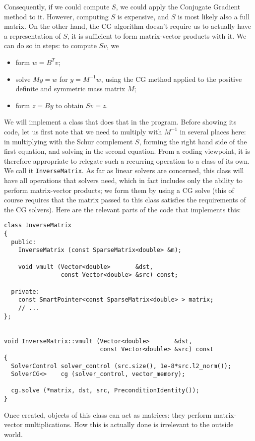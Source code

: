 \documentclass{article}
\begin{document}
Consequently, if we could compute $S$, we could apply the Conjugate Gradient
method to it. However, computing $S$ is expensive, and $S$ is most
likely also a full matrix. On the other hand, the CG algorithm doesn't require
us to actually have a representation of $S$, it is sufficient to form
matrix-vector products with it. We can do so in steps: to compute $Sv$, we 
\begin{itemize}
\item form $w = B^T v$;
\item solve $My = w$ for $y=M^{-1}w$, using the CG method applied to the
  positive definite and symmetric mass matrix $M$;
\item form $z=By$ to obtain $Sv=z$.
\end{itemize}
We will implement a class that does that in the program. Before showing its
code, let us first note that we need to multiply with $M^{-1}$ in several
places here: in multiplying with the Schur complement $S$, forming the right
hand side of the first equation, and solving in the second equation. From a
coding viewpoint, it is therefore appropriate to relegate such a recurring
operation to a class of its own. We call it \texttt{InverseMatrix}. As far as
linear solvers are concerned, this class will have all operations that solvers
need, which in fact includes only the ability to perform matrix-vector
products; we form them by using a CG solve (this of course requires that the
matrix passed to this class satisfies the requirements of the CG
solvers). Here are the relevant parts of the code that implements this:
\begin{verbatim}
class InverseMatrix
{
  public:
    InverseMatrix (const SparseMatrix<double> &m);

    void vmult (Vector<double>       &dst,
                const Vector<double> &src) const;

  private:
    const SmartPointer<const SparseMatrix<double> > matrix;
    // ...
};


void InverseMatrix::vmult (Vector<double>       &dst,
                           const Vector<double> &src) const
{
  SolverControl solver_control (src.size(), 1e-8*src.l2_norm());
  SolverCG<>    cg (solver_control, vector_memory);

  cg.solve (*matrix, dst, src, PreconditionIdentity());        
}
\end{verbatim}
Once created, objects of this class can act as matrices: they perform
matrix-vector multiplications. How this is actually done is irrelevant to the
outside world.
\end{document}
